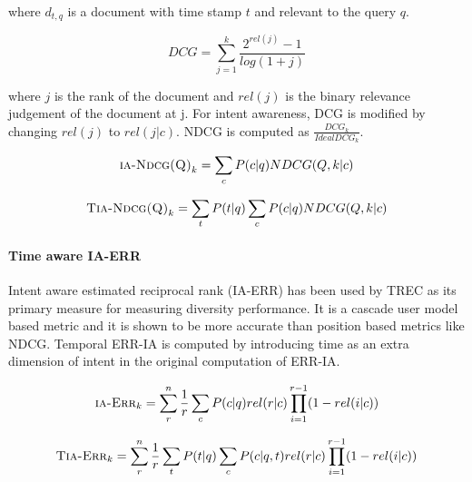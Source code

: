 where $d_{t,q}$ is a document with time stamp $t$ and relevant to the query $q$.

\begin{equation}
DCG = \sum_{j=1}^{k} \frac {2^{rel(j)} -1}{log(1+j)}  
\end{equation}


where $j$ is the rank of the document and $rel(j)$ is the binary relevance judgement of the document at j. For intent awareness, DCG is modified by changing $rel(j)$ to $rel(j|c)$. NDCG is computed as $\frac{DCG_{k}}{Ideal DCG_{k}}$.

\begin{equation}
\textsc{ia-Ndcg(Q)}_k = \sum_{c} P(c|q) NDCG(Q, k|c)
\end{equation}

\begin{equation}
\textsc{Tia-Ndcg(Q)}_k = \sum_{t} P(t|q) \sum_{c} P(c|q) NDCG(Q, k|c)
\end{equation}



\paragraph{Time aware IA-ERR}


Intent aware estimated reciprocal rank (IA-ERR) has been used by TREC as its primary measure for measuring diversity performance. It is a cascade user model based metric and it is shown to be more accurate than position based metrics like NDCG. Temporal ERR-IA is computed by introducing time as an extra dimension of intent in the original computation of ERR-IA. 

\begin{equation}
\textsc{ia-Err}_k = \sum_{r}^{n} \frac{1}{r} \sum_{c} P(c|q) rel(r|c) \prod_{i=1}^{r-1} (1-rel(i|c))
\end{equation}

\begin{equation}
\textsc{Tia-Err}_k = \sum_{r}^{n} \frac{1}{r} \sum_{t} P(t|q) \sum_{c} P(c|q,t) rel(r|c) \prod_{i=1}^{r-1} (1-rel(i|c))
\end{equation}



